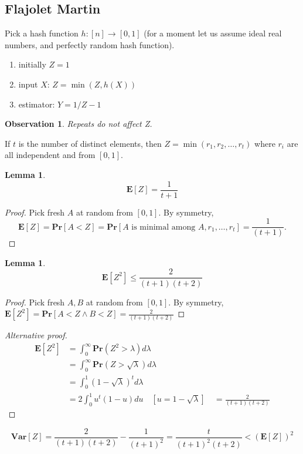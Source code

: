 \documentclass[11pt]{article}
\newcommand{\Ppb}{\mathbf{Pr}}
\newcommand{\Es}{\mathbf{E}}
\newcommand{\Var}{\mathbf{Var}}
\newtheorem{lemma}[theorem]{Lemma}
\newtheorem{observation}[theorem]{Observation}
\begin{document}
\subsection{Flajolet Martin \cite{DBLP:journals/jcss/FlajoletM85}}
Pick a hash function $h: [n] \rightarrow [0,1]$     (for a moment let us assume ideal real numbers, and perfectly random hash function).

\begin{enumerate}
\item initially $Z=1$
\item input $X$: $Z = \min(Z, h(X))$
\item estimator: $Y = 1/Z - 1$
\end{enumerate}

\begin{observation}
Repeats do not affect Z.
\end{observation}

If $t$ is the number of distinct elements, then $Z = \min(r_1, r_2, \dots, r_t)$ where $r_i$ are all independent and from $[0,1]$.

\begin{lemma}
\begin{equation}
    \Es[Z] = \frac{1}{t+1}
\end{equation}
\end{lemma}
\begin{proof}
Pick fresh $A$ at random from $[0,1]$. By symmetry, 
$$\Es[Z] = \Ppb[A<Z] = \Ppb[A\text{ is minimal among }{A,r_1,\dots,r_t}] = \frac{1}{(t+1)}.$$
\end{proof}
\begin{lemma}
\begin{equation}
\Es[Z^2] \leq \frac{2}{(t+1)(t+2)}
\end{equation}
\end{lemma}
\begin{proof}
Pick fresh $A, B$ at random from $[0, 1]$. By symmetry, $\Es[Z^2] = \Ppb[A<Z \wedge B<Z] = \frac{2}{(t+1)(t+2)}$ 
\end{proof}
\begin{proof}[Alternative proof]
\begin{align*}
\Es\left[Z^{2}\right] &=\int_{0}^{\infty} \Ppb\left(Z^{2}>\lambda\right) d \lambda \\
&=\int_{0}^{\infty} \Ppb(Z>\sqrt{\lambda}) d \lambda \\
&=\int_{0}^{1}(1-\sqrt{\lambda})^{t} d \lambda \\
&=2 \int_{0}^{1} u^{t}(1-u) d u \quad[u=1-\sqrt{\lambda}] \quad=\frac{2}{(t+1)(t+2)} \end{align*}
\end{proof}
\begin{equation}
\Var[Z]=\frac{2}{(t+1)(t+2)}-\frac{1}{(t+1)^{2}}=\frac{t}{(t+1)^{2}(t+2)}<(\Es[Z])^{2}
\end{equation}
\end{document}
